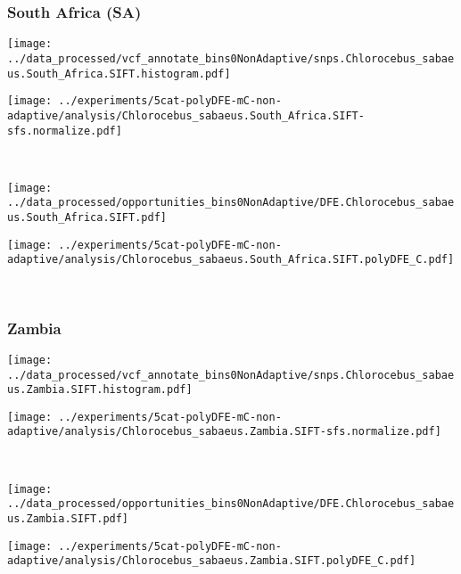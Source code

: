 \subsubsection{South Africa (SA)}

\begin{minipage}{0.49\linewidth}
    \texttt{[image: ../data\_processed/vcf\_annotate\_bins0NonAdaptive/snps.Chlorocebus\_sabaeus.South\_Africa.SIFT.histogram.pdf]}
\end{minipage}
\begin{minipage}{0.49\linewidth}
    \texttt{[image: ../experiments/5cat-polyDFE-mC-non-adaptive/analysis/Chlorocebus\_sabaeus.South\_Africa.SIFT-sfs.normalize.pdf]}
\end{minipage}
\\
\begin{minipage}{0.49\linewidth}
    \texttt{[image: ../data\_processed/opportunities\_bins0NonAdaptive/DFE.Chlorocebus\_sabaeus.South\_Africa.SIFT.pdf]}
\end{minipage}
\begin{minipage}{0.49\linewidth}
    \texttt{[image: ../experiments/5cat-polyDFE-mC-non-adaptive/analysis/Chlorocebus\_sabaeus.South\_Africa.SIFT.polyDFE\_C.pdf]}
\end{minipage}
\\

\subsubsection{Zambia}

\begin{minipage}{0.49\linewidth}
    \texttt{[image: ../data\_processed/vcf\_annotate\_bins0NonAdaptive/snps.Chlorocebus\_sabaeus.Zambia.SIFT.histogram.pdf]}
\end{minipage}
\begin{minipage}{0.49\linewidth}
    \texttt{[image: ../experiments/5cat-polyDFE-mC-non-adaptive/analysis/Chlorocebus\_sabaeus.Zambia.SIFT-sfs.normalize.pdf]}
\end{minipage}
\\
\begin{minipage}{0.49\linewidth}
    \texttt{[image: ../data\_processed/opportunities\_bins0NonAdaptive/DFE.Chlorocebus\_sabaeus.Zambia.SIFT.pdf]}
\end{minipage}
\begin{minipage}{0.49\linewidth}
    \texttt{[image: ../experiments/5cat-polyDFE-mC-non-adaptive/analysis/Chlorocebus\_sabaeus.Zambia.SIFT.polyDFE\_C.pdf]}
\end{minipage}
\\

